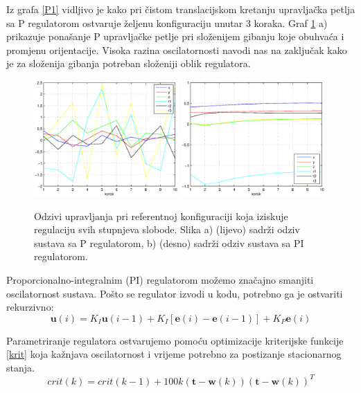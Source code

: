 \documentclass[times, utf8, diplomski, numeric]{fer}
\begin{document}
Iz grafa \ref{P1} vidljivo je kako pri čistom translacijskom kretanju upravljačka petlja sa P regulatorom ostvaruje željenu konfiguraciju unutar 3 koraka.
Graf \ref{PPI} a) prikazuje ponašanje P upravljačke petlje pri složenijem gibanju koje obuhvaća i promjenu orijentacije.
Visoka razina oscilatornosti navodi nas na zaključak kako je za složenija gibanja potreban složeniji oblik regulatora.
\begin{figure}[h!]
\centering
\includegraphics[width = 0.49\textwidth]{Preg}
\includegraphics[width = 0.49\textwidth]{PIreg}
\caption{Odzivi upravljanja pri referentnoj konfiguraciji koja iziskuje regulaciju svih stupnjeva slobode.
Slika a) (lijevo) sadrži odziv sustava sa P regulatorom, b) (desno) sadrži odziv sustava sa PI regulatorom.} \label{PPI}
\end{figure}

Proporcionalno-integralnim (PI) regulatorom možemo značajno smanjiti oscilatornost sustava.
Pošto se regulator izvodi u kodu, potrebno ga je ostvariti rekurzivno:
\begin{equation}
\mathbf{u}(i)  = K_I\mathbf{u}(i-1) + K_I[\mathbf{e}(i) - \mathbf{e}(i-1)] + K_P\mathbf{e}(i)
\end{equation}

Parametriranje regulatora ostvarujemo pomoću optimizacije kriterijske funkcije \ref{krit} koja kažnjava oscilatornost i vrijeme potrebno za postizanje stacionarnog stanja.
\begin{equation}
crit(k) = crit(k-1) + 100 k (\mathbf{t} - \mathbf{w}(k)) (\mathbf{t} - \mathbf{w}(k))^T
\label{krit}
\end{equation}
\end{document}
